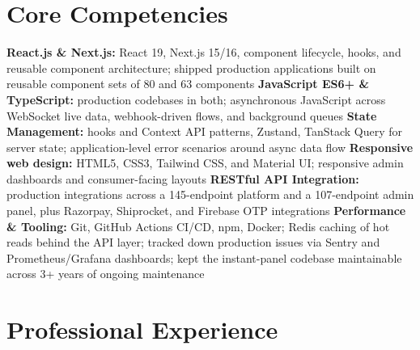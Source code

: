 \documentclass[11pt,a4paper,sans]{moderncv}
\begin{document}
\section{Core Competencies}
\vspace{1pt}
\raggedright
\textbf{React.js \& Next.js:} React 19, Next.js 15/16, component lifecycle, hooks, and reusable component architecture; shipped production applications built on reusable component sets of 80 and 63 components \textbar{}
\textbf{JavaScript ES6+ \& TypeScript:} production codebases in both; asynchronous JavaScript across WebSocket live data, webhook-driven flows, and background queues \textbar{}
\textbf{State Management:} hooks and Context API patterns, Zustand, TanStack Query for server state; application-level error scenarios around async data flow \textbar{}
\textbf{Responsive web design:} HTML5, CSS3, Tailwind CSS, and Material UI; responsive admin dashboards and consumer-facing layouts \textbar{}
\textbf{RESTful API Integration:} production integrations across a 145-endpoint platform and a 107-endpoint admin panel, plus Razorpay, Shiprocket, and Firebase OTP integrations \textbar{}
\textbf{Performance \& Tooling:} Git, GitHub Actions CI/CD, npm, Docker; Redis caching of hot reads behind the API layer; tracked down production issues via Sentry and Prometheus/Grafana dashboards; kept the instant-panel codebase maintainable across 3+ years of ongoing maintenance
\par\normalfont


\section{Professional Experience}
\vspace{3pt}
\end{document}
